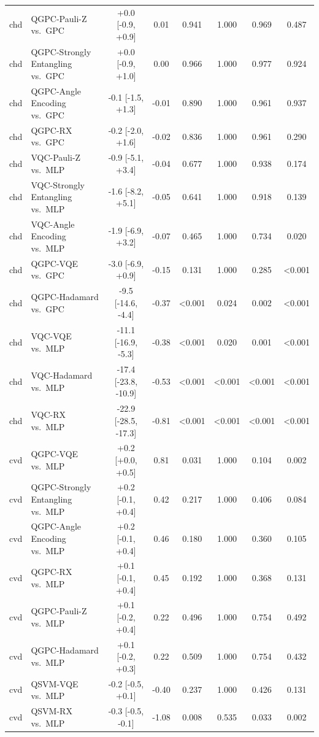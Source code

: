 \begin{tabular}{llcccccc}
chd & QGPC-Pauli-Z vs.\ GPC & +0.0 [-0.9, +0.9] & 0.01 & 0.941 & 1.000 & 0.969 & 0.487 \\
chd & QGPC-Strongly Entangling vs.\ GPC & +0.0 [-0.9, +1.0] & 0.00 & 0.966 & 1.000 & 0.977 & 0.924 \\
chd & QGPC-Angle Encoding vs.\ GPC & -0.1 [-1.5, +1.3] & -0.01 & 0.890 & 1.000 & 0.961 & 0.937 \\
chd & QGPC-RX vs.\ GPC & -0.2 [-2.0, +1.6] & -0.02 & 0.836 & 1.000 & 0.961 & 0.290 \\
chd & VQC-Pauli-Z vs.\ MLP & -0.9 [-5.1, +3.4] & -0.04 & 0.677 & 1.000 & 0.938 & 0.174 \\
chd & VQC-Strongly Entangling vs.\ MLP & -1.6 [-8.2, +5.1] & -0.05 & 0.641 & 1.000 & 0.918 & 0.139 \\
chd & VQC-Angle Encoding vs.\ MLP & -1.9 [-6.9, +3.2] & -0.07 & 0.465 & 1.000 & 0.734 & 0.020 \\
chd & QGPC-VQE vs.\ GPC & -3.0 [-6.9, +0.9] & -0.15 & 0.131 & 1.000 & 0.285 & <0.001 \\
chd & QGPC-Hadamard vs.\ GPC & -9.5 [-14.6, -4.4] & -0.37 & <0.001 & 0.024 & 0.002 & <0.001 \\
chd & VQC-VQE vs.\ MLP & -11.1 [-16.9, -5.3] & -0.38 & <0.001 & 0.020 & 0.001 & <0.001 \\
chd & VQC-Hadamard vs.\ MLP & -17.4 [-23.8, -10.9] & -0.53 & <0.001 & <0.001 & <0.001 & <0.001 \\
chd & VQC-RX vs.\ MLP & -22.9 [-28.5, -17.3] & -0.81 & <0.001 & <0.001 & <0.001 & <0.001 \\
cvd & QGPC-VQE vs.\ MLP & +0.2 [+0.0, +0.5] & 0.81 & 0.031 & 1.000 & 0.104 & 0.002 \\
cvd & QGPC-Strongly Entangling vs.\ MLP & +0.2 [-0.1, +0.4] & 0.42 & 0.217 & 1.000 & 0.406 & 0.084 \\
cvd & QGPC-Angle Encoding vs.\ MLP & +0.2 [-0.1, +0.4] & 0.46 & 0.180 & 1.000 & 0.360 & 0.105 \\
cvd & QGPC-RX vs.\ MLP & +0.1 [-0.1, +0.4] & 0.45 & 0.192 & 1.000 & 0.368 & 0.131 \\
cvd & QGPC-Pauli-Z vs.\ MLP & +0.1 [-0.2, +0.4] & 0.22 & 0.496 & 1.000 & 0.754 & 0.492 \\
cvd & QGPC-Hadamard vs.\ MLP & +0.1 [-0.2, +0.3] & 0.22 & 0.509 & 1.000 & 0.754 & 0.432 \\
cvd & QSVM-VQE vs.\ MLP & -0.2 [-0.5, +0.1] & -0.40 & 0.237 & 1.000 & 0.426 & 0.131 \\
cvd & QSVM-RX vs.\ MLP & -0.3 [-0.5, -0.1] & -1.08 & 0.008 & 0.535 & 0.033 & 0.002 \\

\end{tabular}
